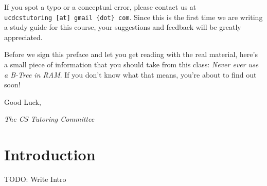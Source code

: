 \documentclass[]{book}
\begin{document}
If you spot a typo or a conceptual error, please contact us at
\texttt{ucdcstutoring\ {[}at{]}\ gmail\ \{dot\}\ com}. Since this is the
first time we are writing a study guide for this course, your
suggestions and feedback will be greatly appreciated.

Before we sign this preface and let you get reading with the real
material, here's a small piece of information that you should take from
this class: \emph{Never ever use a B-Tree in RAM}. If you don't know
what that means, you're about to find out soon!

Good Luck,

\emph{The CS Tutoring Committee}

\hypertarget{introduction}{%
\chapter{Introduction}\label{introduction}}

TODO: Write Intro


\end{document}
